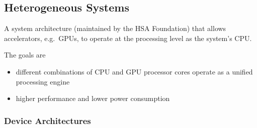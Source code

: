 \hypertarget{heterogeneous-systems}{%
\subsection{Heterogeneous Systems}\label{heterogeneous-systems}}

A system architecture (maintained by the HSA Foundation) that allows
accelerators, e.g.~GPUs, to operate at the processing level as the
system's CPU.

The goals are

\begin{itemize}
\tightlist
\item
  different combinations of CPU and GPU processor cores operate as a
  unified processing engine
\item
  higher performance and lower power consumption
\end{itemize}

\clearpage
\hypertarget{device-architectures}{%
\subsubsection{Device Architectures}\label{device-architectures}}


